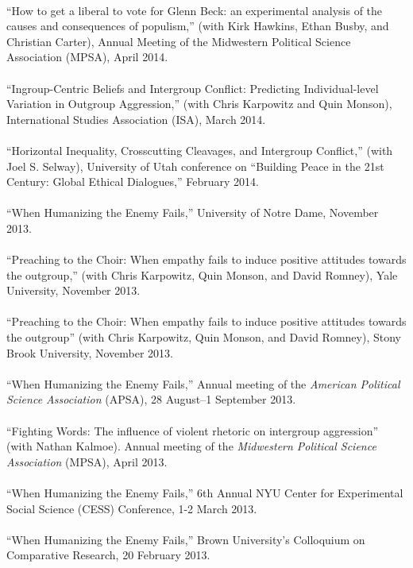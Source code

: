 \documentclass[10pt]{article}
\begin{document}
\ \\
``How to get a liberal to vote for Glenn Beck: an experimental analysis of the causes and consequences of populism,'' (with Kirk Hawkins, Ethan Busby, and Christian Carter), Annual Meeting of the Midwestern Political Science Association (MPSA), April 2014.\\
\ \\
``Ingroup-Centric Beliefs and Intergroup Conflict: Predicting Individual-level Variation in Outgroup Aggression,'' (with Chris Karpowitz and Quin Monson), International Studies Association (ISA), March 2014.\\
\ \\
``Horizontal Inequality, Crosscutting Cleavages, and Intergroup Conflict,'' (with Joel S. Selway), University of Utah conference on  ``Building Peace in the 21st Century: Global Ethical Dialogues,'' February 2014.\\
\ \\
``When Humanizing the Enemy Fails,''  University of Notre Dame, November 2013.\\
\ \\
``Preaching to the Choir: When empathy fails to induce positive attitudes towards the outgroup,'' (with Chris Karpowitz, Quin Monson, and David Romney),  Yale University, November 2013.\\
\ \\
``Preaching to the Choir: When empathy fails to induce positive attitudes towards the outgroup'' (with Chris Karpowitz, Quin Monson, and David Romney), Stony Brook University, November 2013.\\
\ \\
``When Humanizing the Enemy Fails,''  Annual meeting of the {\em American Political Science Association} (APSA), 28 August--1 September 2013.\\
\ \\
``Fighting Words: The influence of violent rhetoric on intergroup aggression'' (with Nathan Kalmoe).  Annual meeting of the {\em Midwestern Political Science Association} (MPSA), April 2013.\\
\ \\
``When Humanizing the Enemy Fails,''  6th Annual NYU Center for Experimental Social Science (CESS) Conference, 1-2 March 2013.\\
\ \\
``When Humanizing the Enemy Fails,''  Brown University's Colloquium on Comparative Research, 20 February 2013.\\
\ \\
\end{document}
